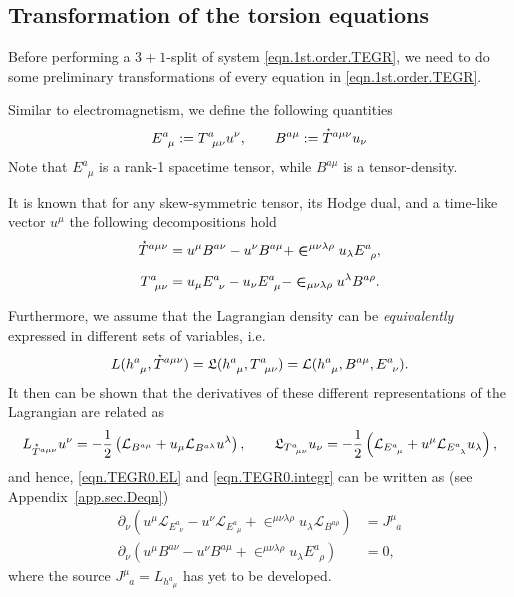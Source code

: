 \documentclass[
10pt, %
a4paper, %
oneside, %
headinclude,footinclude, %
BCOR5mm, %
]{scrartcl}
\newcommand{\tetrsymbol}{h}
\newcommand{\tetr}[2]{\tetrsymbol^{#1}_{\phantom{#1}#2}}
\newcommand{\D}[1]{\partial_{#1}} %
\newcommand{\Tors}[2]{T^{#1}_{\phantom{a}#2}}
\newcommand{\ET}[2]{E^{#1}_{\phantom{#1}#2}}	%
\newcommand{\BT}[2]{B^{#1#2}}	%
\newcommand{\Laghodge}{L}%
\newcommand{\Lagtors}{\mathfrak{L}}%
\newcommand{\LagBE}{\mathcal{L}}%
\newcommand{\LCsymb}{\bm{\in}}    %
\newcommand{\HDT}[1]{\accentset{\star}{T}^{#1}}
\newcommand{\NC}[2]{J^{#2}_{\phantom{#2}#1}}
\begin{document}
\subsection{Transformation of the torsion equations}\label{sec.transform.potential}


Before performing a $ 3+1 $-split \cite{Alcubierre2008} of system \eqref{eqn.1st.order.TEGR}, we 
need to do some preliminary transformations of every equation in \eqref{eqn.1st.order.TEGR}. 


Similar to electromagnetism, we define the following quantities
\begin{equation}
\ET{a}{\mu} := \Tors{a}{\mu\nu} u^\nu, \qquad  \BT{a}{\mu} := \HDT{a\mu\nu} u_\nu
\end{equation}
Note that $ \ET{a}{\mu} $ is a rank-1 spacetime tensor, while $ \BT{a}{\mu} $ is a tensor-density.

It is known that for any skew-symmetric tensor, its Hodge dual, and a time-like vector $ u^\mu $ 
the following 
decompositions hold
\begin{subequations}\label{eqn.T.decompos}
\begin{align}
\HDT{a\mu\nu} &= u^\mu \BT{a}{\nu} - u^\nu \BT{a}{\mu} + 
\LCsymb^{\mu\nu\lambda\rho}u_\lambda 
\ET{a}{\rho},\\[2mm]
\Tors{a}{\mu\nu} &= u_\mu \ET{a}{\nu} - u_\nu \ET{a}{\mu} - 
\LCsymb_{\mu\nu\lambda\rho}u^\lambda 
\BT{a}{\rho}.
\end{align}
\end{subequations}

Furthermore, we assume that the Lagrangian density can be \textit{equivalently} expressed in 
different sets of variables, i.e. 
\begin{equation}\label{eqn.Lagrangians2}
\Laghodge(\tetr{a}{\mu},\HDT{a\mu\nu}) = \Lagtors(\tetr{a}{\mu},\Tors{a}{\mu\nu}) = 
\LagBE(\tetr{a}{\mu},\BT{a}{\mu},\ET{a}{\nu}).
\end{equation}
It then can be shown that the derivatives of these different representations of the Lagrangian are related as
\begin{equation}
\Laghodge_{\HDT{a\mu\nu}}u^\nu = -\frac12\left( \LagBE_{\BT{a}{\mu}} +u_\mu 
\LagBE_{\BT{a}{\lambda}} u^\lambda \right), \label{eqn.1st.order.EL}
\qquad 
\Lagtors_{\Tors{a}{\mu\nu}}u_\nu = -\frac12\left( \LagBE_{\ET{a}{\mu}} + u^\mu 
\LagBE_{\ET{a}{\lambda}} u_\lambda \right),
\end{equation}
and hence, \eqref{eqn.TEGR0.EL} and \eqref{eqn.TEGR0.integr} 
can be written as (see Appendix~\eqref{app.sec.Deqn})
\begin{subequations}\label{eqn.tors.BE}
	\begin{align}
		\D{\nu}( u^\mu\LagBE_{\ET{a}{\nu}} - u^\nu \LagBE_{\ET{a}{\mu}} + 
		\LCsymb^{\mu\nu\lambda\rho}u_\lambda\LagBE_{\BT{a}{\rho}}) 
		&= \NC{a}{\mu}\label{eqn.tors.BE.a} \\[2mm]
%		
		\D{\nu}(u^\mu \BT{a}{\nu} - u^\nu\BT{a}{\mu} + 
		\LCsymb^{\mu\nu\lambda\rho}u_\lambda\ET{a}{\rho}) &= 0,
	\end{align}
\end{subequations}
where the source $ \NC{a}{\mu} = \Laghodge_{\tetr{a}{\mu}} $ has yet to be developed.
\end{document}
